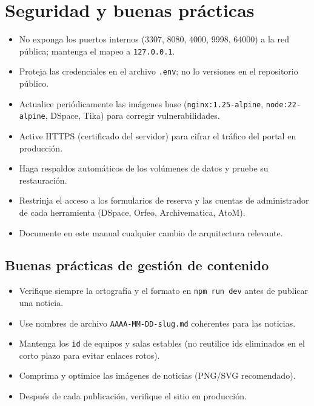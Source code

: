 \documentclass[12pt,a4paper]{report}
\begin{document}
\chapter{Seguridad y buenas prácticas}

\begin{itemize}
  \item No exponga los puertos internos (3307, 8080, 4000, 9998, 64000) a la
        red pública; mantenga el mapeo a \texttt{127.0.0.1}.
  \item Proteja las credenciales en el archivo \texttt{.env}; no lo versiones
        en el repositorio público.
  \item Actualice periódicamente las imágenes base (\texttt{nginx:1.25-alpine},
        \texttt{node:22-alpine}, DSpace, Tika) para corregir vulnerabilidades.
  \item Active HTTPS (certificado del servidor) para cifrar el tráfico del
        portal en producción.
  \item Haga respaldos automáticos de los volúmenes de datos y pruebe su
        restauración.
  \item Restrinja el acceso a los formularios de reserva y las cuentas de
        administrador de cada herramienta (DSpace, Orfeo, Archivematica, AtoM).
  \item Documente en este manual cualquier cambio de arquitectura relevante.
\end{itemize}

\section{Buenas prácticas de gestión de contenido}

\begin{itemize}
  \item Verifique siempre la ortografía y el formato en \texttt{npm run dev}
        antes de publicar una noticia.
  \item Use nombres de archivo \texttt{AAAA-MM-DD-slug.md} coherentes para
        las noticias.
  \item Mantenga los \texttt{id} de equipos y salas estables (no reutilice
        ids eliminados en el corto plazo para evitar enlaces rotos).
  \item Comprima y optimice las imágenes de noticias (PNG/SVG recomendado).
  \item Después de cada publicación, verifique el sitio en producción.
\end{itemize}
\end{document}
